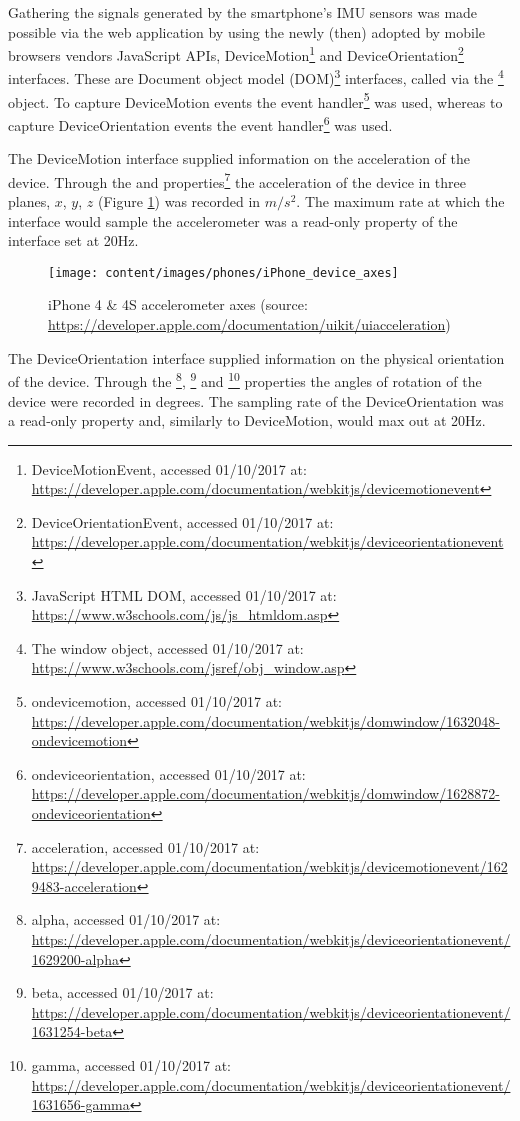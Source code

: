 Gathering the signals generated by the smartphone's \gls{IMU} sensors was made possible via the web application by using the newly (then) adopted by mobile browsers vendors JavaScript \gls{API}s, DeviceMotion\footnote{DeviceMotionEvent, accessed 01/10/2017 at: \url{https://developer.apple.com/documentation/webkitjs/devicemotionevent}} and DeviceOrientation\footnote{DeviceOrientationEvent, accessed 01/10/2017 at: \url{https://developer.apple.com/documentation/webkitjs/deviceorientationevent}} interfaces. These are Document object model (\gls{DOM})\footnote{JavaScript HTML DOM, accessed 01/10/2017 at: \url{https://www.w3schools.com/js/js_htmldom.asp}} interfaces, called via the \footnote{The window object, accessed 01/10/2017 at: \url{https://www.w3schools.com/jsref/obj_window.asp}} object. To capture DeviceMotion events the  event handler\footnote{ondevicemotion, accessed 01/10/2017 at: \url{https://developer.apple.com/documentation/webkitjs/domwindow/1632048-ondevicemotion}} was used, whereas to capture DeviceOrientation events the  event handler\footnote{ondeviceorientation, accessed 01/10/2017 at: \url{https://developer.apple.com/documentation/webkitjs/domwindow/1628872-ondeviceorientation}} was used. 

The DeviceMotion interface supplied information on the acceleration of the device. Through the  and  properties\footnote{acceleration, accessed 01/10/2017 at: \url{https://developer.apple.com/documentation/webkitjs/devicemotionevent/1629483-acceleration}} the acceleration of the device in three planes, $x$, $y$, $z$ (Figure \ref{fig:iphoneAxes}) was recorded in $m/s^{2}$. The maximum rate at which the interface would sample the accelerometer was a read-only property of the interface set at 20Hz.

\begin{figure}[h]
	\centering
	\texttt{[image: content/images/phones/iPhone\_device\_axes]}
	\caption{iPhone 4 \& 4S accelerometer axes (source: \url{https://developer.apple.com/documentation/uikit/uiacceleration})}
	\label{fig:iphoneAxes}
\end{figure}

The DeviceOrientation interface supplied information on the physical orientation of the device. Through the \footnote{alpha, accessed 01/10/2017 at: \url{https://developer.apple.com/documentation/webkitjs/deviceorientationevent/1629200-alpha}}, \footnote{beta, accessed 01/10/2017 at: \url{https://developer.apple.com/documentation/webkitjs/deviceorientationevent/1631254-beta}} and \footnote{gamma, accessed 01/10/2017 at: \url{https://developer.apple.com/documentation/webkitjs/deviceorientationevent/1631656-gamma}} properties the angles of rotation of the device were recorded in degrees. The sampling rate of the DeviceOrientation was a read-only property and, similarly to DeviceMotion, would max out at 20Hz. 

